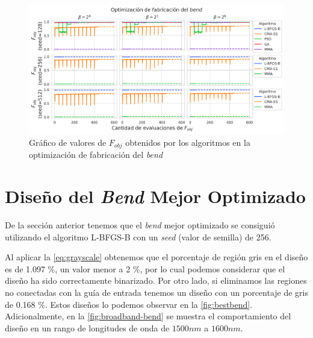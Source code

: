 \begin{landscape}
\begin{figure}[ht]
  \centering
  \includegraphics[scale=1.0]{image/results/bend/bend-opt-fab.png}
  \caption{Gráfico de valores de $F_{obj}$ obtenidos por los algoritmos en la optimización de fabricación del \emph{bend}}
  \label{fig:bend-fab}
\end{figure}
\end{landscape}

\section{Diseño del \emph{Bend} Mejor Optimizado}\label{sec:best-bend}

De la sección anterior tenemos que el \emph{bend} mejor optimizado se consiguió
utilizando el algoritmo L-BFGS-B con un \emph{seed} (valor de semilla) de 256.

Al aplicar la \autoref{eq:grayscale} obtenemos que el porcentaje de región gris en el diseño
es de 1.097 \%, un valor menor a 2 \%, por lo cual podemos considerar que el diseño ha sido
correctamente binarizado. Por otro lado, si eliminamos las regiones no conectadas con la guía de entrada
tenemos un diseño con un porcentaje de gris de 0.168 \%.
Estos diseños lo podemos observar en la \autoref{fig:bestbend}.
Adicionalmente, en la \autoref{fig:broadband-bend} se muestra el comportamiento del diseño
en un rango de longitudes de onda de $1500nm$ a $1600 nm$.

